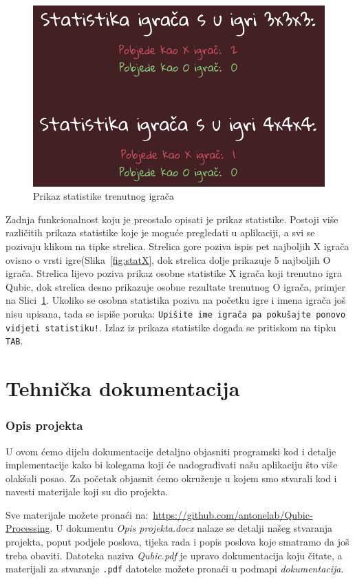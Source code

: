 \documentclass[12pt]{scrartcl}
\begin{document}
\begin{figure}[h]
	\centering
	\includegraphics[scale=0.4]{statIgrac.png}
	\caption{Prikaz statistike trenutnog igrača}
	\label{fig:stat}
\end{figure}
Zadnja funkcionalnost koju je preostalo opisati je prikaz statistike. Postoji više različitih prikaza statistike koje je moguće pregledati u aplikaciji, a svi se pozivaju klikom na tipke strelica. Strelica gore poziva ispis pet najboljih X igrača ovisno o vrsti igre(Slika~\ref{fig:statX}, dok strelica dolje prikazuje 5 najboljih O igrača. Strelica lijevo poziva prikaz osobne statistike X igrača koji trenutno igra Qubic, dok strelica desno prikazuje osobne rezultate trenutnog O igrača, primjer na Slici~\ref{fig:stat}. Ukoliko se osobna statistika poziva na početku igre i imena igrača još nisu upisana, tada se ispiše poruka: \texttt{Upišite ime igrača pa pokušajte ponovo vidjeti statistiku!}. Izlaz iz prikaza statistike događa se pritiskom na tipku \texttt{TAB}.


\part{Tehnička dokumentacija}
\section{Opis projekta}
U ovom ćemo dijelu dokumentacije detaljno objasniti programski kod i detalje implementacije kako bi kolegama koji će nadograđivati našu aplikaciju što više olakšali posao. Za početak objasnit ćemo okruženje u kojem smo stvarali kod i navesti materijale koji su dio projekta. 

Sve materijale možete pronaći na:~\url{https://github.com/antonelab/Qubic-Processing}. U dokumentu \emph{Opis projekta.docx} nalaze se detalji našeg stvaranja projekta, poput podjele poslova, tijeka rada i popis poslova koje smatramo da još treba obaviti. Datoteka naziva \emph{Qubic.pdf} je upravo dokumentacija koju čitate, a materijali za stvaranje \texttt{.pdf} datoteke možete pronaći u podmapi \emph{dokumentacija}.
\end{document}

